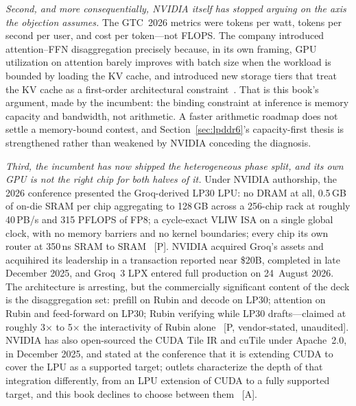 \emph{Second, and more consequentially, NVIDIA itself has stopped arguing on the axis the objection assumes.} The GTC~2026 metrics were tokens per watt, tokens per second per user, and cost per token---not FLOPS. The company introduced attention--FFN disaggregation precisely because, in its own framing, GPU utilization on attention barely improves with batch size when the workload is bounded by loading the KV cache, and introduced new storage tiers that treat the KV cache as a first-order architectural constraint~\cite{gtc2026-roadmap,semianalysis-gtc}. That is this book's argument, made by the incumbent: the binding constraint at inference is memory capacity and bandwidth, not arithmetic. A faster arithmetic roadmap does not settle a memory-bound contest, and Section~\ref{sec:lpddr6}'s capacity-first thesis is strengthened rather than weakened by NVIDIA conceding the diagnosis.

\emph{Third, the incumbent has now shipped the heterogeneous phase split, and its own GPU is not the right chip for both halves of it.} Under NVIDIA authorship, the 2026 conference presented the Groq-derived LP30 LPU: no DRAM at all, 0.5\,GB of on-die SRAM per chip aggregating to 128\,GB across a 256-chip rack at roughly 40\,PB/s and 315 PFLOPS of FP8; a cycle-exact VLIW ISA on a single global clock, with no memory barriers and no kernel boundaries; every chip its own router at 350\,ns SRAM to SRAM~\cite{hc2026-lpu} [P]. NVIDIA acquired Groq's assets and acquihired its leadership in a transaction reported near \$20B, completed in late December 2025, and Groq~3 LPX entered full production on 24~August 2026. The architecture is arresting, but the commercially significant content of the deck is the disaggregation set: prefill on Rubin and decode on LP30; attention on Rubin and feed-forward on LP30; Rubin verifying while LP30 drafts---claimed at roughly 3$\times$ to 5$\times$ the interactivity of Rubin alone~\cite{hc2026-lpu} [P, vendor-stated, unaudited]. NVIDIA has also open-sourced the CUDA Tile IR and cuTile under Apache~2.0, in December 2025, and stated at the conference that it is extending CUDA to cover the LPU as a supported target; outlets characterize the depth of that integration differently, from an LPU extension of CUDA to a fully supported target, and this book declines to choose between them~\cite{cuda-tile} [A].


